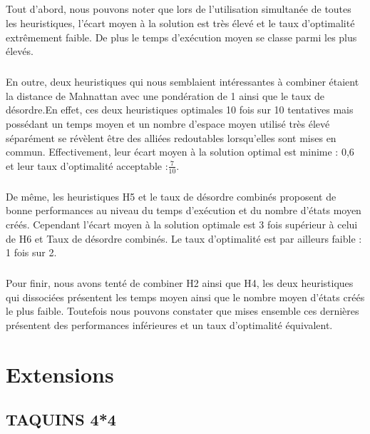 \documentclass[10pt,a4paper]{report}
\begin{document}
\paragraph{}{Tout d'abord, nous pouvons noter que lors de l'utilisation simultanée de toutes les heuristiques, l'écart moyen à la solution est très élevé et le taux d'optimalité extrêmement faible. De plus le temps d'exécution moyen se classe parmi les plus élevés.}
\paragraph{}{En outre, deux heuristiques qui nous semblaient intéressantes à combiner étaient la distance de Mahnattan avec une pondération de 1 ainsi que le taux de désordre.En effet, ces deux heuristiques optimales 10 fois sur 10 tentatives mais possédant un temps moyen et un nombre d'espace moyen utilisé très élevé séparément  se révèlent être des alliées redoutables lorsqu'elles sont mises en commun. Effectivement, leur écart moyen à la solution optimal est minime : 0,6 et leur taux d'optimalité acceptable :$\frac{7}{10}$. }

\paragraph{}{De même, les heuristiques H5 et le taux de désordre combinés proposent de bonne performances au niveau du temps d'exécution et du nombre d'états moyen créés. Cependant l'écart moyen à la solution optimale est 3 fois supérieur à celui de H6 et Taux de désordre combinés. Le taux d'optimalité est par ailleurs faible : 1 fois sur 2.}

\paragraph{}{Pour finir, nous avons tenté de combiner H2 ainsi que H4, les deux heuristiques qui dissociées présentent les temps moyen ainsi que le nombre moyen d'états créés le plus faible.  Toutefois nous pouvons constater que mises ensemble ces dernières présentent des performances inférieures et un taux d'optimalité équivalent. }
\newline
\chapter{Extensions}
\section{TAQUINS 4*4}
\end{document}
